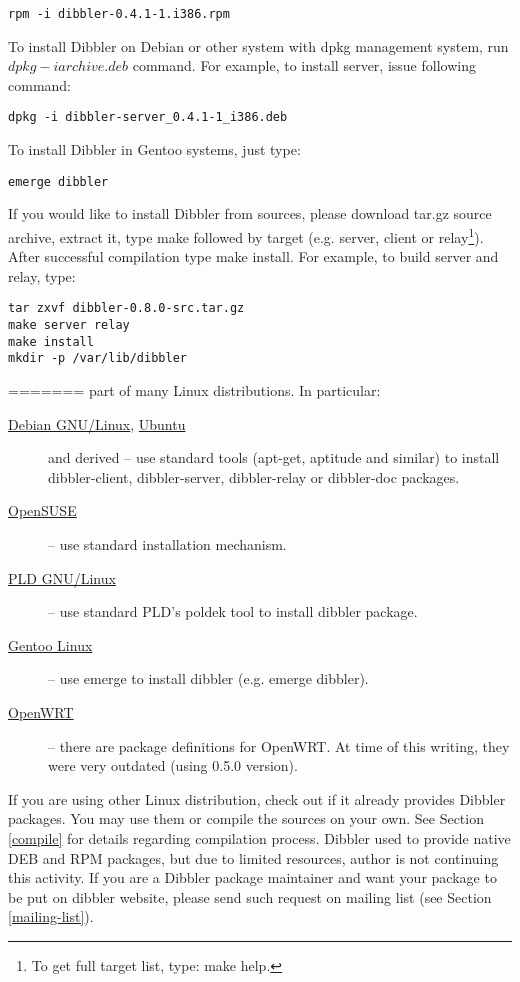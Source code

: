 \begin{verbatim}
rpm -i dibbler-0.4.1-1.i386.rpm
\end{verbatim}

To install Dibbler on Debian or other system with dpkg management
system, run $dpkg -i archive.deb$ command. For example, to install
server, issue following command:

\begin{verbatim}
dpkg -i dibbler-server_0.4.1-1_i386.deb
\end{verbatim}

To install Dibbler in Gentoo systems, just type:

\begin{verbatim}
emerge dibbler
\end{verbatim}

If you would like to install Dibbler from sources, please download tar.gz
source archive, extract it, type make followed by target (e.g. server,
client or relay\footnote{To get full target list, type: make help.}).
After successful compilation type make install. For example, to build
server and relay, type:

\begin{verbatim}
tar zxvf dibbler-0.8.0-src.tar.gz
make server relay
make install
mkdir -p /var/lib/dibbler
\end{verbatim}

=======
part of many Linux distributions. In particular:
\begin{description}
 \item[\href{http://debian.org}{Debian
 GNU/Linux}, \href{http://ubuntu.com}{Ubuntu}] and derived -- use
 standard tools (apt-get, aptitude and similar) to install
 dibbler-client, dibbler-server, dibbler-relay or dibbler-doc packages.
\item[\href{http://opensuse.org}{OpenSUSE}] -- use standard
 installation mechanism.
\item[\href{http://www.pld-linux.org}{PLD GNU/Linux}]
 -- use standard PLD's poldek tool to install dibbler
 package.  \item[\href{http://www.gentoo.org}{Gentoo Linux}] -- use
 emerge to install dibbler (e.g. emerge dibbler).
\item[\href{http://openwrt.org}{OpenWRT}] -- there are package
 definitions for OpenWRT. At time of this writing, they were very
 outdated (using 0.5.0 version).
\end{description}

If you are using other Linux distribution, check out if it already
provides Dibbler packages. You may use them or compile the sources on
your own. See Section \ref{compile} for details regarding compilation
process. Dibbler used to provide native DEB and RPM packages, but due
to limited resources, author is not continuing this activity. If you
are a Dibbler package maintainer and want your package to be put on
dibbler website, please send such request on mailing list (see
Section \ref{mailing-list}).

